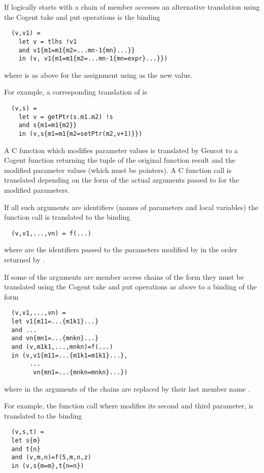 If  logically starts with a chain of member accesses  an alternative translation using the Cogent
take and put operations is the binding
\begin{verbatim}
  (v,v1) =
    let v = tlhs !v1
    and v1{m1=m1{m2=...mn-1{mn}...}} 
    in (v, v1{m1=m1{m2=...mn-1{mn=expr}...}})
\end{verbatim}
where  is as above for the assignment using  as the new value.

For example, a corresponding translation of  is
\begin{verbatim}
  (v,s) =
    let v = getPtr(s.m1.m2) !s
    and s{m1=m1{m2}}
    in (v,s{m1=m1{m2=setPtr(m2,v+1)}})
\end{verbatim}

A C function which modifies parameter values is translated by Gencot to a Cogent function returning the tuple 
of the original function result  and the modified parameter values  (which must be pointers). 
A C function call  is
translated depending on the form of the actual arguments passed to  for the modified parameters.

If all such arguments are identifiers (names of parameters and local variables) the function call is translated to
the binding
\begin{verbatim}
  (v,v1,...,vn) = f(...)
\end{verbatim}
where  are the identifiers passed to the parameters modified by  in the order returned by .

If some of the arguments are member access chains of the form  they must be translated using the 
Cogent take and put operations as above to a binding of the form
\begin{verbatim}
  (v,v1,...,vn) = 
  let v1{m11=...{m1k1}...}
  and ... 
  and vn{mn1=...{mnkn}...}
  and (v,m1k1,...,mnkn)=f(...)
  in (v,v1{m11=...{m1k1=m1k1}...},
       ...
        vn{mn1=...{mnkn=mnkn}...})
\end{verbatim}
where in the arguments of  the chains are replaced by their last member name .

For example, the function call  where  modifies its second and third parameter, is translated
to the binding
\begin{verbatim}
  (v,s,t) = 
  let s{m}
  and t{n}
  and (v,m,n)=f(5,m,n,z)
  in (v,s{m=m},t{n=n})
\end{verbatim}

